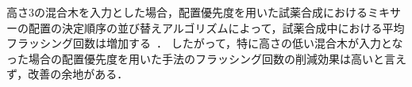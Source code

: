 



高さ3の混合木を入力とした場合，配置優先度を用いた試薬合成におけるミキサーの配置の決定順序の並び替えアルゴリズムによって，試薬合成中における平均フラッシング回数は増加する~\cite{10089903}．
したがって，特に高さの低い混合木が入力となった場合の配置優先度を用いた手法のフラッシング回数の削減効果は高いと言えず，改善の余地がある．

